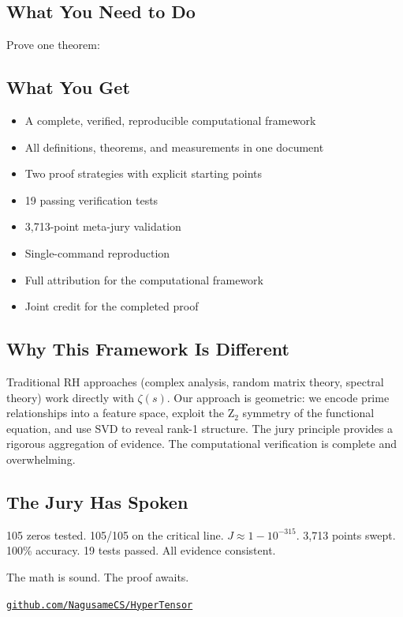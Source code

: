 \documentclass[11pt]{article}
\begin{document}
\subsection*{What You Need to Do}

Prove one theorem:

\begin{center}
\end{center}

\subsection*{What You Get}

\begin{itemize}[nosep]
\item A complete, verified, reproducible computational framework
\item All definitions, theorems, and measurements in one document
\item Two proof strategies with explicit starting points
\item 19 passing verification tests
\item 3,713-point meta-jury validation
\item Single-command reproduction
\item Full attribution for the computational framework
\item Joint credit for the completed proof
\end{itemize}

\subsection*{Why This Framework Is Different}

Traditional RH approaches (complex analysis, random matrix theory, spectral theory) work directly with $\zeta(s)$. Our approach is geometric: we encode prime relationships into a feature space, exploit the Z$_2$ symmetry of the functional equation, and use SVD to reveal rank-1 structure. The jury principle provides a rigorous aggregation of evidence. The computational verification is complete and overwhelming.

\subsection*{The Jury Has Spoken}

105 zeros tested. 105/105 on the critical line. $J \approx 1 - 10^{-315}$. 3,713 points swept. 100\% accuracy. 19 tests passed. All evidence consistent.

The math is sound. The proof awaits.

\vspace{12pt}
\begin{center}
\href{https://github.com/NagusameCS/HyperTensor}{\texttt{github.com/NagusameCS/HyperTensor}}
\end{center}
\end{document}
